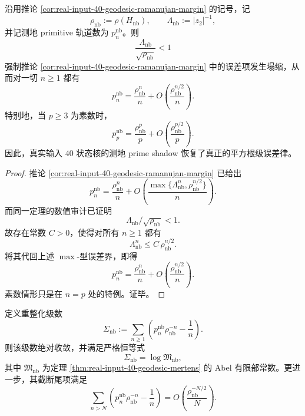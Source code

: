 \begin{theorem}\label{thm:conclusion-realinput40-geodesic-prime-shadow-square-root-law}
沿用推论 \ref{cor:real-input-40-geodesic-ramanujan-margin} 的记号，记
\[
\rho_{\mathrm{nb}}:=\rho(H_{\mathrm{nb}}),
\qquad
\Lambda_{\mathrm{nb}}:=|z_2|^{-1},
\]
并记测地 primitive 轨道数为 \(p_n^{\mathrm{nb}}\)。则
\[
\frac{\Lambda_{\mathrm{nb}}}{\sqrt{\rho_{\mathrm{nb}}}}<1
\]
强制推论 \ref{cor:real-input-40-geodesic-ramanujan-margin} 中的误差项发生塌缩，从而对一切 \(n\ge 1\) 都有
\[
p_n^{\mathrm{nb}}
=
\frac{\rho_{\mathrm{nb}}^n}{n}
+O\!\left(\frac{\rho_{\mathrm{nb}}^{n/2}}{n}\right).
\]
特别地，当 \(p\ge 3\) 为素数时，
\[
p_p^{\mathrm{nb}}
=
\frac{\rho_{\mathrm{nb}}^p}{p}
+O\!\left(\frac{\rho_{\mathrm{nb}}^{p/2}}{p}\right).
\]
因此，真实输入 \(40\) 状态核的测地 prime shadow 恢复了真正的平方根级误差律。
\end{theorem}
\begin{proof}
推论 \ref{cor:real-input-40-geodesic-ramanujan-margin} 已给出
\[
p_n^{\mathrm{nb}}
=
\frac{\rho_{\mathrm{nb}}^n}{n}
+O\!\left(
\frac{\max\{\Lambda_{\mathrm{nb}}^n,\rho_{\mathrm{nb}}^{n/2}\}}{n}
\right).
\]
而同一定理的数值审计已证明
\[
\Lambda_{\mathrm{nb}}/\sqrt{\rho_{\mathrm{nb}}}<1.
\]
故存在常数 \(C>0\)，使得对所有 \(n\ge 1\) 都有
\[
\Lambda_{\mathrm{nb}}^n\le C\,\rho_{\mathrm{nb}}^{n/2}.
\]
将其代回上述 \(\max\)-型误差界，即得
\[
p_n^{\mathrm{nb}}
=
\frac{\rho_{\mathrm{nb}}^n}{n}
+O\!\left(\frac{\rho_{\mathrm{nb}}^{n/2}}{n}\right).
\]
素数情形只是在 \(n=p\) 处的特例。证毕。
\end{proof}
\begin{theorem}\label{thm:conclusion-realinput40-geodesic-mertens-absolutely-summable}
定义重整化级数
\[
\Sigma_{\mathrm{nb}}
:=
\sum_{n\ge 1}\left(p_n^{\mathrm{nb}}\rho_{\mathrm{nb}}^{-n}-\frac1n\right).
\]
则该级数绝对收敛，并满足严格恒等式
\[
\Sigma_{\mathrm{nb}}=\log \mathfrak M_{\mathrm{nb}},
\]
其中 \(\mathfrak M_{\mathrm{nb}}\) 为定理 \ref{thm:real-input-40-geodesic-mertens} 的 Abel 有限部常数。更进一步，其截断尾项满足
\[
\sum_{n>N}\left(p_n^{\mathrm{nb}}\rho_{\mathrm{nb}}^{-n}-\frac1n\right)
=
O\!\left(\frac{\rho_{\mathrm{nb}}^{-N/2}}{N}\right).
\]
\end{theorem}
